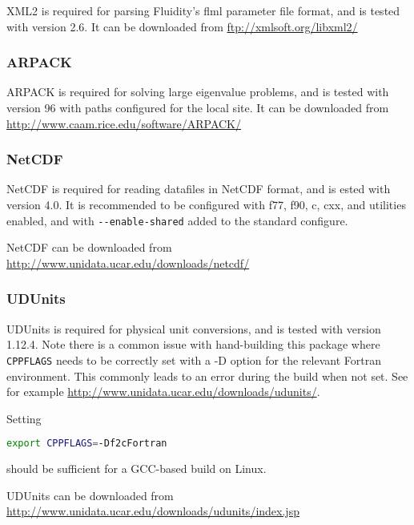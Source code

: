 XML2 is required for parsing Fluidity's flml parameter file format, and is
tested with version 2.6. It can be downloaded from \url{ftp://xmlsoft.org/libxml2/}

\subsubsection{ARPACK}
\label{sect:required_libraries_supporting_arpack}

ARPACK is required for solving large eigenvalue problems, and is tested with
version 96 with paths configured for the local site. It can be downloaded from
\url{http://www.caam.rice.edu/software/ARPACK/}

\subsubsection{NetCDF}
\label{sect:required_libraries_supporting_netcdf}

NetCDF is required for reading datafiles in NetCDF format, and is ested with
version 4.0. It is recommended to be configured with f77, f90, c, cxx, and
utilities enabled, and with \lstinline[language=bash]+--enable-shared+ added to
the standard configure. 

NetCDF can be downloaded from \url{http://www.unidata.ucar.edu/downloads/netcdf/}

\subsubsection{UDUnits}
\label{sect:required_libraries_supporting_udunits}

UDUnits is required for physical unit conversions, and is tested with version
1.12.4. Note there is a common issue with hand-building this package where
\lstinline[language=bash]+CPPFLAGS+ needs to be correctly set with a -D
option for the relevant Fortran environment. This commonly leads to an error
during the build when not set. See for example
\url{http://www.unidata.ucar.edu/downloads/udunits/}.

Setting

\begin{lstlisting}[language=bash]
export CPPFLAGS=-Df2cFortran
\end{lstlisting}

should be sufficient for a GCC-based build on Linux.

UDUnits can be downloaded from \url{http://www.unidata.ucar.edu/downloads/udunits/index.jsp}

